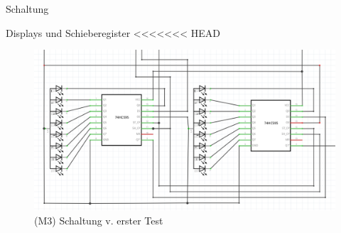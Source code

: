 \documentclass[mathserif,9pt]{article}
\begin{document}
    \begin{frame}{Schaltung}
        \begin{block}{Displays und Schieberegister}
<<<<<<< HEAD
               \begin{figure}
                    \centering
                    \includegraphics[height=0.5\paperheight]{img/bitshift-register_2x.png}
                    \caption[M3]{(M3) Schaltung v. erster Test}
                    \label{fig:bitshift_2x}
               \end{figure}
        \end{block}
    \end{frame}
\end{document}
